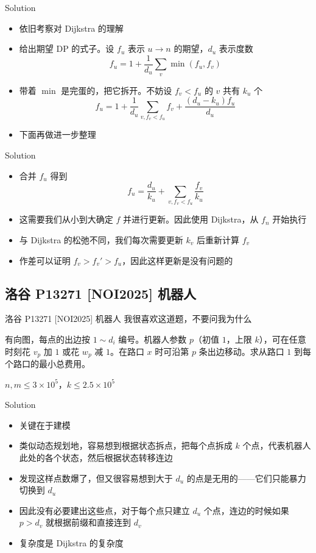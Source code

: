 ﻿\documentclass[aspectratio=169]{ctexbeamer}
\begin{document}
\begin{frame}{Solution}
    \begin{itemize}
        \item 依旧考察对 Dijkstra 的理解
        \item 给出期望 DP 的式子。设 $f_u$ 表示 $u\to n$ 的期望，$d_u$ 表示度数
        $$
            f_u=1+\frac{1}{d_u}\sum_{v}\min(f_u,f_v)
        $$
        \item 带着 $\min$ 是完蛋的，把它拆开。不妨设 $f_v<f_u$ 的 $v$ 共有 $k_u$ 个
        $$
            f_u=1+\frac{1}{d_u}\sum_{v,f_v<f_u}f_v+\frac{(d_u-k_u)f_u}{d_u}
        $$
        \item 下面再做进一步整理
    \end{itemize}
\end{frame}


\begin{frame}{Solution}
    \begin{itemize}
        \item 合并 $f_u$ 得到
        $$
            f_u=\frac{d_u}{k_u}+\sum_{v,f_v<f_u}\frac{f_v}{k_u}
        $$
        \item 这需要我们从小到大确定 $f$ 并进行更新。因此使用 Dijkstra，从 $f_n$ 开始执行
        \item 与 Dijkstra 的松弛不同，我们每次需要更新 $k_v$ 后重新计算 $f_v$
        \item 作差可以证明 $f_v>f_v'>f_u$，因此这样更新是没有问题的
    \end{itemize}
\end{frame}




\subsection{洛谷 P13271 [NOI2025] 机器人}

\begin{frame}{洛谷 P13271 [NOI2025] 机器人}
    我很喜欢这道题，不要问我为什么

    有向图，每点的出边按 $1\sim d_i$ 编号。机器人参数 $p$（初值 $1$，上限 $k$），可在任意时刻花 $v_p$ 加 $1$ 或花 $w_p$ 减 $1$。在路口 $x$ 时可沿第 $p$ 条出边移动。求从路口 $1$ 到每个路口的最小总费用。

    $n,m\le 3\times 10^5$，$k\le 2.5\times 10^5$
\end{frame}

\begin{frame}{Solution}
    \begin{itemize}
        \item 关键在于建模
        \item 类似动态规划地，容易想到根据状态拆点，把每个点拆成 $k$ 个点，代表机器人此处的各个状态，然后根据状态转移连边
        \item 发现这样点数爆了，但又很容易想到大于 $d_u$ 的点是无用的——它们只能暴力切换到 $d_u$
        \item 因此没有必要建出这些点，对于每个点只建立 $d_u$ 个点，连边的时候如果 $p>d_v$ 就根据前缀和直接连到 $d_v$
        \item 复杂度是 Dijkstra 的复杂度
    \end{itemize}
\end{frame}
\end{document}
